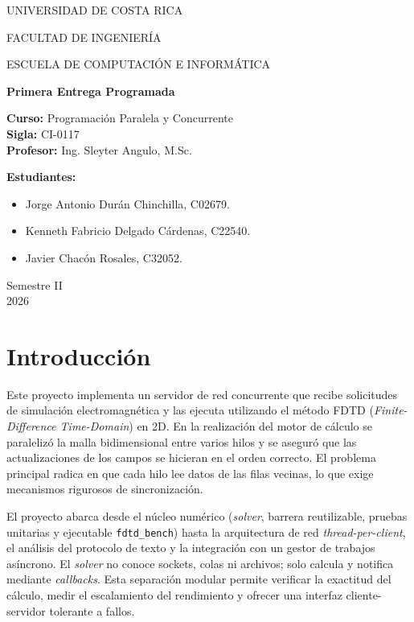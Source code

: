 \documentclass[12pt,a4paper]{article}
\begin{document}
\begin{titlepage}
\centering
{\Large UNIVERSIDAD DE COSTA RICA\par}
\vspace{0.8cm}
{\large FACULTAD DE INGENIERÍA\par}
\vspace{0.4cm}
{\large ESCUELA DE COMPUTACIÓN E INFORMÁTICA\par}
\vspace{2.0cm}
{\LARGE\bfseries Primera Entrega Programada\par}
\vspace{1.5cm}
\begin{flushleft}
\textbf{Curso:} Programación Paralela y Concurrente\\[0.3cm]
\textbf{Sigla:} CI-0117\\[0.3cm]
\textbf{Profesor:} Ing. Sleyter Angulo, M.Sc.
\end{flushleft}
\vspace{0.8cm}
\textbf{Estudiantes:}
\begin{itemize}[leftmargin=1.2cm]
\item Jorge Antonio Durán Chinchilla, C02679.
\item Kenneth Fabricio Delgado Cárdenas, C22540.
\item Javier Chacón Rosales, C32052.
\end{itemize}
\vfill
Semestre II\\2026
\end{titlepage}

\section{Introducción}
Este proyecto implementa un servidor de red concurrente que recibe solicitudes de simulación electromagnética y las ejecuta utilizando el método FDTD (\textit{Finite-Difference Time-Domain}) en 2D. En la realización del motor de cálculo se paralelizó la malla bidimensional entre varios hilos y se aseguró que las actualizaciones de los campos se hicieran en el orden correcto. El problema principal radica en que cada hilo lee datos de las filas vecinas, lo que exige mecanismos rigurosos de sincronización.

El proyecto abarca desde el núcleo numérico (\textit{solver}, barrera reutilizable, pruebas unitarias y ejecutable \texttt{fdtd\_bench}) hasta la arquitectura de red \textit{thread-per-client}, el análisis del protocolo de texto y la integración con un gestor de trabajos asíncrono. El \textit{solver} no conoce sockets, colas ni archivos; solo calcula y notifica mediante \textit{callbacks}. Esta separación modular permite verificar la exactitud del cálculo, medir el escalamiento del rendimiento y ofrecer una interfaz cliente-servidor tolerante a fallos.
\end{document}
